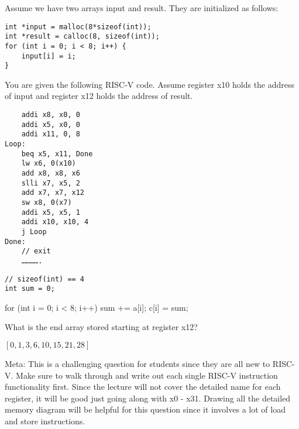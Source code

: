 \begin{blocksection}
\question Assume we have two arrays input and result. They are initialized as follows:

\begin{verbatim}
int *input = malloc(8*sizeof(int));
int *result = calloc(8, sizeof(int));
for (int i = 0; i < 8; i++) {
    input[i] = i;
}
\end{verbatim}

You are given the following RISC-V code. Assume register x10 holds the address of input and register x12 holds the address of result.

\begin{verbatim}
    addi x8, x0, 0
    addi x5, x0, 0
    addi x11, 0, 8
Loop:
    beq x5, x11, Done
    lw x6, 0(x10)
    add x8, x8, x6
    slli x7, x5, 2
    add x7, x7, x12
    sw x8, 0(x7)
    addi x5, x5, 1
    addi x10, x10, 4
    j Loop
Done:
    // exit
    ………….
\end{verbatim}

\begin{verbatim}
// sizeof(int) == 4
int sum = 0;
\end{verbatim}
\begin{solution}[0.7in]
for (int i = 0; i < 8; i++) {
    sum += a[i];
    c[i] = sum;
}
\end{solution}

\question What is the end array stored starting at register x12?

\begin{solution}
$[0, 1, 3, 6, 10, 15, 21, 28]$

Meta: This is a challenging question for students since they are all new to RISC-V. Make sure to walk through and write out each single RISC-V instruction functionality first. Since the lecture will not cover the detailed name for each register, it will be good just going along with x0 - x31. Drawing all the detailed memory diagram will be helpful for this question since it involves a lot of load and store instructions. 
\end{solution}
\end{blocksection}